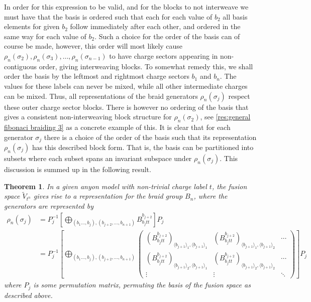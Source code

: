 \documentclass[a4paper,10pt,oneside]{book}
\theoremstyle{plain}
\newtheorem{theorem}{Theorem}[section]
\theoremstyle{definition}
\theoremstyle{remark}
\begin{document}
In order for this expression to be valid, and for the blocks to not interweave we must have that the basis is ordered such that each for each value of $b_2$ all basis elements for given $b_2$ follow immediately after each other, and ordered in the same way for each value of $b_2$. Such a choice for the order of the basis can of course be made, however, this order will most likely cause $ρ_n(σ_2), ρ_n(σ_3), \dots, ρ_n(σ_{n-1})$ to have charge sectors appearing in non-contiguous order, giving interweaving blocks. To somewhat remedy this, we shall order the basis by the leftmost and rightmost charge sectors $b_1$ and $b_n$. The values for these labels can never be mixed, while all other intermediate charges can be mixed. Thus, all representations of the braid generators $ρ_n(σ_j)$ respect these outer charge sector blocks. There is however no ordering of the basis that gives a consistent non-interweaving block structure for $ρ_n(σ_2)$, see \cref{res:general fibonaci braiding 3} as a concrete example of this. It is clear that for each generator $σ_j$ there is a choice of the order of the basis such that its representation $ρ_n(σ_j)$ has this described block form. That is, the basis can be partitioned into subsets where each subset spans an invariant subspace under $ρ_n(σ_j)$. This discussion is summed up in the following result.

\begin{theorem}
  In a given anyon model with non-trivial charge label $t$, the fusion space $\widetilde{V}_{t^n}$ gives rise to a representation for the braid group $B_n$, where the generators are represented by
  \begin{align*}
    ρ_n(σ_j)
    &= P_j^{-1} \left[\bigoplus_{(b_1\ldots,b_j),(b_{j+2}, \ldots, b_{n+1})} B_{b_{j}tt}^{b_{j+2}} \right]P_j \\
    &= P_j^{-1} \left[\bigoplus_{(b_1\ldots,b_j),(b_{j+2}, \ldots, b_{n+1})}
    \begin{pmatrix}
      \left( B_{b_{j}tt}^{b_{j+2}} \right)_{\langle b_{j+1} \rangle_1, \langle b_{j+1} \rangle_1} & \left( B_{b_{j}tt}^{b_{j+2}} \right)_{\langle b_{j+1} \rangle_1, \langle b_{j+1} \rangle_2} & \cdots \\
      \left( B_{b_{j}tt}^{b_{j+2}} \right)_{\langle b_{j+1} \rangle_2, \langle b_{j+1} \rangle_1} & \left( B_{b_{j}tt}^{b_{j+2}} \right)_{\langle b_{j+1} \rangle_2, \langle b_{j+1} \rangle_2} & \cdots \\
      \vdots & \vdots & \ddots
    \end{pmatrix}
    \right]P_j
  \end{align*}
  where $P_j$ is some permutation matrix, permuting the basis of the fusion space as described above.
\end{theorem}
\end{document}

